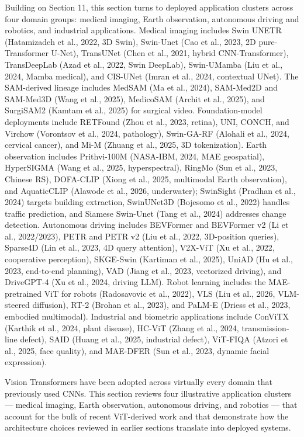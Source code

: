 Building on Section 11, this section turns to deployed application clusters across four domain groups: medical imaging, Earth observation, autonomous driving and robotics, and industrial applications. Medical imaging includes Swin UNETR (Hatamizadeh et al., 2022, 3D Swin), Swin-Unet (Cao et al., 2023, 2D pure-Transformer U-Net), TransUNet (Chen et al., 2021, hybrid CNN-Transformer), TransDeepLab (Azad et al., 2022, Swin DeepLab), Swin-UMamba (Liu et al., 2024, Mamba medical), and CIS-UNet (Imran et al., 2024, contextual UNet). The SAM-derived lineage includes MedSAM (Ma et al., 2024), SAM-Med2D and SAM-Med3D (Wang et al., 2025), MedicoSAM (Archit et al., 2025), and SurgiSAM2 (Kamtam et al., 2025) for surgical video. Foundation-model deployments include RETFound (Zhou et al., 2023, retina), UNI, CONCH, and Virchow (Vorontsov et al., 2024, pathology), Swin-GA-RF (Alohali et al., 2024, cervical cancer), and Mi-M (Zhuang et al., 2025, 3D tokenization). Earth observation includes Prithvi-100M (NASA-IBM, 2024, MAE geospatial), HyperSIGMA (Wang et al., 2025, hyperspectral), RingMo (Sun et al., 2023, Chinese RS), DOFA-CLIP (Xiong et al., 2025, multimodal Earth observation), and AquaticCLIP (Alawode et al., 2026, underwater); SwinSight (Pradhan et al., 2024) targets building extraction, SwinUNet3D (Bojesomo et al., 2022) handles traffic prediction, and Siamese Swin-Unet (Tang et al., 2024) addresses change detection. Autonomous driving includes BEVFormer and BEVFormer v2 (Li et al., 2022/2023), PETR and PETR v2 (Liu et al., 2022, 3D-position queries), Sparse4D (Lin et al., 2023, 4D query attention), V2X-ViT (Xu et al., 2022, cooperative perception), SKGE-Swin (Kartiman et al., 2025), UniAD (Hu et al., 2023, end-to-end planning), VAD (Jiang et al., 2023, vectorized driving), and DriveGPT-4 (Xu et al., 2024, driving LLM). Robot learning includes the MAE-pretrained ViT for robots (Radosavovic et al., 2022), VLS (Liu et al., 2026, VLM-steered diffusion), RT-2 (Brohan et al., 2023), and PaLM-E (Driess et al., 2023, embodied multimodal). Industrial and biometric applications include ConViTX (Karthik et al., 2024, plant disease), HC-ViT (Zhang et al., 2024, transmission-line defect), SAID (Huang et al., 2025, industrial defect), ViT-FIQA (Atzori et al., 2025, face quality), and MAE-DFER (Sun et al., 2023, dynamic facial expression).

Vision Transformers have been adopted across virtually every domain that previously used CNNs. This section reviews four illustrative application clusters --- medical imaging, Earth observation, autonomous driving, and robotics --- that account for the bulk of recent ViT-derived work and that demonstrate how the architecture choices reviewed in earlier sections translate into deployed systems.

